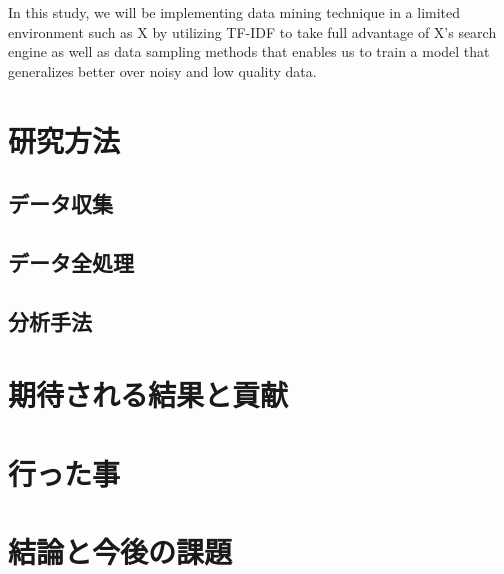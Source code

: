 \documentclass{jabstract}
\begin{document}
\begin{multicols}{2}
In this study, we will be implementing data mining technique in a limited environment such as X by utilizing TF-IDF to take full advantage of X's search engine as well as data sampling methods that enables us to train a model that generalizes better over noisy and low quality data.

\section{研究方法}
\subsection{データ収集}
\subsection{データ全処理}
\subsection{分析手法}
\section{期待される結果と貢献}
\section{行った事}
\section{結論と今後の課題}

{\small


}

\end{multicols}
\end{document}
